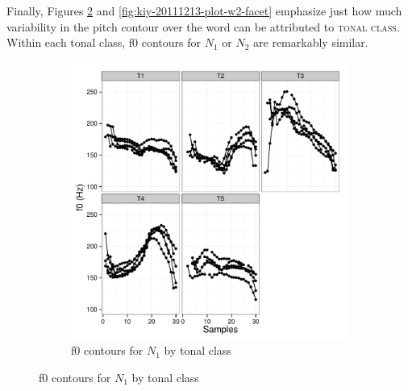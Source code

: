 \documentclass[12pt]{article}
\begin{document}
Finally, Figures \ref{fig:kiy-20111213-plot-w1-facet} and
\ref{fig:kiy-20111213-plot-w2-facet} emphasize just how much variability in
the pitch contour over the word can be attributed to \textsc{tonal
  class}. Within each tonal class, f0 contours for $N_1$  or $N_2$ are
remarkably similar.

\begin{figure}
\centering
\begin{subfigure}[t]{0.5\textwidth}
  \centering
  \includegraphics[width=\textwidth]{kiy-20111213-plot-w1-facet}
  \caption{f0 contours for $N_1$ by tonal class}
  \label{fig:kiy-20111213-plot-w1-facet}
\end{subfigure}


\end{figure}
\end{document}
